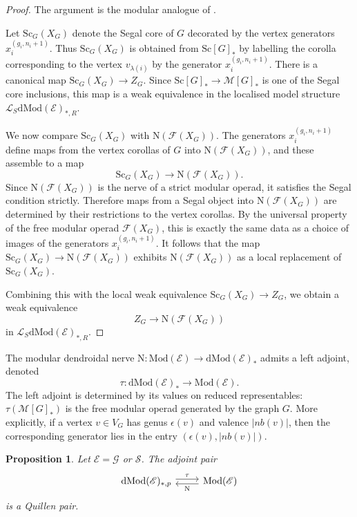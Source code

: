 \documentclass{amsart}
\newcommand{\bE}{\mathscr{E}}
\newcommand{\bM}{\mathscr{M}}
\newcommand{\sSet}{\mathscr{S}}
\newcommand{\Grpd}{\mathscr{G}}
\newcommand{\Mod}{\mathrm{Mod}}
\newcommand{\dMod}{\mathrm{dMod}}
\newcommand{\Sc}{\mathrm{Sc}}
\newcommand{\nerve}{\mathrm{N}}
\newcommand{\nb}{nb}
\newtheorem{prop}[theorem]{Proposition}%
\theoremstyle{definition}
\numberwithin{equation}{section}
\begin{document}
\begin{proof}
The argument is the modular analogue of \cite[Proposition~4.4]{bh_group_actions_segal}.

Let $\Sc_G(X_G)$ denote the Segal core of $G$ decorated by the vertex generators $x_i^{(g_i,n_i+1)}$. Thus $\Sc_G(X_G)$ is obtained from $\Sc[G]_*$ by labelling the corolla corresponding to the vertex $v_{\lambda(i)}$ by the generator $x_i^{(g_i,n_i+1)}$. There is a canonical map $\Sc_G(X_G)\longrightarrow Z_G.$  Since $\Sc[G]_*\to \bM[G]_*$ is one of the Segal core inclusions, this map is a weak equivalence in the localised model structure $\mathcal L_S\dMod(\bE)_{*,R}$.

We now compare $\Sc_G(X_G)$ with $\nerve(\mathcal F(X_G))$. The generators $x_i^{(g_i,n_i+1)}$ define maps from the vertex corollas of $G$ into
$\nerve(\mathcal F(X_G))$, and these assemble to a map
\[
\Sc_G(X_G)\longrightarrow \nerve(\mathcal F(X_G)).
\] Since $\nerve(\mathcal F(X_G))$ is the nerve of a strict modular operad, it satisfies the Segal condition strictly. Therefore maps from a Segal object into $\nerve(\mathcal F(X_G))$ are determined by their restrictions to the vertex corollas. By the universal property of the free modular operad
$\mathcal F(X_G)$, this is exactly the same data as a choice of images of the generators $x_i^{(g_i,n_i+1)}$. It follows that the map $\Sc_G(X_G)\longrightarrow \nerve(\mathcal F(X_G))$ exhibits $\nerve(\mathcal F(X_G))$ as a local replacement of $\Sc_G(X_G)$.

Combining this with the local weak equivalence $\Sc_G(X_G)\to Z_G$, we obtain a weak equivalence
\[
Z_G\longrightarrow \nerve(\mathcal F(X_G))
\]
in $\mathcal L_S\dMod(\bE)_{*,R}$.
\end{proof}

The modular dendroidal nerve $\nerve:\Mod(\bE)\longrightarrow \dMod(\bE)_*$  admits a left adjoint, denoted
\[
\tau:\dMod(\bE)_*\longrightarrow \Mod(\bE).
\]
The left adjoint is determined by its values on reduced representables: $\tau(\bM[G]_*)$ is the free modular operad generated by the graph $G$. More explicitly, if a vertex $v\in V_G$ has genus $\epsilon(v)$ and valence $|\nb(v)|$, then the corresponding generator lies in the entry $(\epsilon(v),|\nb(v)|)$.

\begin{prop}\label{quillen pair projective}
Let $\bE=\Grpd$ or $\sSet$. The adjoint pair
\[
\begin{tikzcd}
\dMod(\bE)_{*,p} \arrow[r, shift left=1, "\tau"] &
\Mod(\bE) \arrow[l, shift left=1, "\nerve"]
\end{tikzcd}
\]
is a Quillen pair.
\end{prop}
\end{document}
